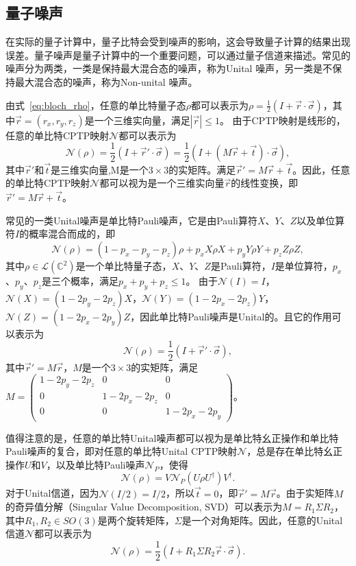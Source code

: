\subsection{量子噪声}
在实际的量子计算中，量子比特会受到噪声的影响，这会导致量子计算的结果出现误差。量子噪声是量子计算中的一个重要问题，可以通过量子信道来描述。常见的噪声分为两类，一类是保持最大混合态的噪声，称为Unital 噪声，另一类是不保持最大混合态的噪声，称为Non-unital 噪声。

由式~\ref{eq:bloch_rho}，任意的单比特量子态$\rho$都可以表示为$\rho = \frac{1}{2}(I + \vec{r}\cdot\vec{\sigma})$，其中$\vec{r} = (r_x, r_y, r_z)$是一个三维实向量，满足$|\vec{r}| \leq 1$。
由于CPTP映射是线形的，任意的单比特CPTP映射$\mathcal{N}$都可以表示为
\begin{equation}
    \mathcal{N}(\rho) = \frac{1}{2}(I + \vec{r}'\cdot\vec{\sigma})= \frac{1}{2}(I + (M\vec{r}+\vec{t})\cdot\vec{\sigma}),
\end{equation}
其中$\vec{r}'$和$\vec{t}$是三维实向量,M是一个$3\times 3$的实矩阵。满足$\vec{r}'= M\vec{r}+\vec{t}$。因此，任意的单比特CPTP映射$\mathcal{N}$都可以视为是一个三维实向量$\vec{r}$的线性变换，即$\vec{r}' = M\vec{r}+\vec{t}$。

常见的一类Unital噪声是单比特Pauli噪声，它是由Pauli算符$X$、$Y$、$Z$以及单位算符$I$的概率混合而成的，即
\begin{equation}\label{eq:pauli_noise}
    \mathcal{N}(\rho) = (1-p_x-p_y-p_z)\rho + p_x X\rho X + p_y Y\rho Y + p_z Z\rho Z,
\end{equation}
其中$\rho\in \mathcal{L}(\mathbb{C}^2)$是一个单比特量子态，$X$、$Y$、$Z$是Pauli算符，$I$是单位算符，$p_x$、$p_y$、$p_z$是三个概率，满足$p_x+p_y+p_z \leq 1$。
由于$\mathcal{N}(I) = I$，$\mathcal{N}(X)=(1-2p_y-2p_z)X$，$\mathcal{N}(Y)=(1-2p_x-2p_z)Y$，$\mathcal{N}(Z)=(1-2p_x-2p_y)Z$，因此单比特Pauli噪声是Unital的。且它的作用可以表示为
\begin{equation}
    \mathcal{N}(\rho) = \frac{1}{2}(I + \vec{r}'\cdot\vec{\sigma}),
\end{equation}
其中$\vec{r}' = M\vec{r}$，$M$是一个$3\times 3$的实矩阵，满足$M = \begin{pmatrix} 1-2p_y-2p_z & 0 & 0 \\ 0 & 1-2p_x-2p_z & 0 \\ 0 & 0 & 1-2p_x-2p_y \end{pmatrix}$。

值得注意的是，任意的单比特Unital噪声都可以视为是单比特幺正操作和单比特Pauli噪声的复合，即对任意的单比特Unital CPTP映射$\mathcal{N}$，总是存在单比特幺正操作$U$和$V$，以及单比特Pauli噪声$\mathcal{N}_P$，使得
\begin{equation}
    \mathcal{N}(\rho) = V\mathcal{N}_P(U\rho U^\dagger)V^\dagger.
\end{equation}
对于Unital信道，因为$\mathcal{N}(I/2) = I/2$，所以$\vec{t} = 0$，即$\vec{r}' = M\vec{r}$。由于实矩阵$M$的奇异值分解（Singular Value Decomposition, SVD）可以表示为$M = R_1\Sigma R_2$，其中$R_1,R_2 \in SO(3)$是两个旋转矩阵，$\Sigma$是一个对角矩阵。因此，任意的Unital信道$\mathcal{N}$都可以表示为
\begin{equation}
    \mathcal{N}(\rho) = \frac{1}{2}(I + R_1\Sigma R_2\vec{r}\cdot\vec{\sigma}).
\end{equation}

